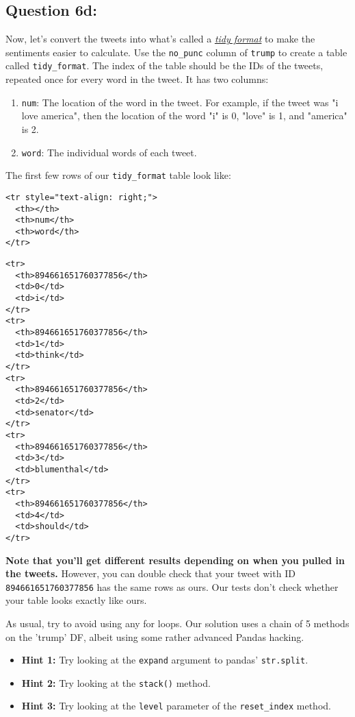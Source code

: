 \documentclass[11pt]{article}
\providecommand{\tightlist}{%
      \setlength{\itemsep}{0pt}\setlength{\parskip}{0pt}}
\begin{document}
    \subsection{Question 6d:}\label{question-6d}

Now, let's convert the tweets into what's called a
\href{https://cran.r-project.org/web/packages/tidyr/vignettes/tidy-data.html}{\emph{tidy
format}} to make the sentiments easier to calculate. Use the
\texttt{no\_punc} column of \texttt{trump} to create a table called
\texttt{tidy\_format}. The index of the table should be the IDs of the
tweets, repeated once for every word in the tweet. It has two columns:

\begin{enumerate}
\def\labelenumi{\arabic{enumi}.}
\tightlist
\item
  \texttt{num}: The location of the word in the tweet. For example, if
  the tweet was "i love america", then the location of the word "i" is
  0, "love" is 1, and "america" is 2.
\item
  \texttt{word}: The individual words of each tweet.
\end{enumerate}

The first few rows of our \texttt{tidy\_format} table look like:

\begin{verbatim}
<tr style="text-align: right;">
  <th></th>
  <th>num</th>
  <th>word</th>
</tr>
\end{verbatim}

\begin{verbatim}
<tr>
  <th>894661651760377856</th>
  <td>0</td>
  <td>i</td>
</tr>
<tr>
  <th>894661651760377856</th>
  <td>1</td>
  <td>think</td>
</tr>
<tr>
  <th>894661651760377856</th>
  <td>2</td>
  <td>senator</td>
</tr>
<tr>
  <th>894661651760377856</th>
  <td>3</td>
  <td>blumenthal</td>
</tr>
<tr>
  <th>894661651760377856</th>
  <td>4</td>
  <td>should</td>
</tr>
\end{verbatim}

\textbf{Note that you'll get different results depending on when you
pulled in the tweets.} However, you can double check that your tweet
with ID \texttt{894661651760377856} has the same rows as ours. Our tests
don't check whether your table looks exactly like ours.

As usual, try to avoid using any for loops. Our solution uses a chain of
5 methods on the 'trump' DF, albeit using some rather advanced Pandas
hacking.

\begin{itemize}
\item
  \textbf{Hint 1:} Try looking at the \texttt{expand} argument to
  pandas' \texttt{str.split}.
\item
  \textbf{Hint 2:} Try looking at the \texttt{stack()} method.
\item
  \textbf{Hint 3:} Try looking at the \texttt{level} parameter of the
  \texttt{reset\_index} method.
\end{itemize}
\end{document}
